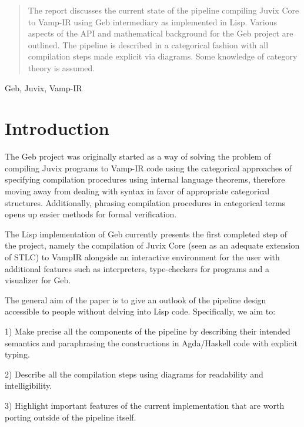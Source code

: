 



\begin{abstract}
The report discusses the current state of the pipeline compiling Juvix Core to Vamp-IR using Geb intermediary as implemented in Lisp. Various aspects of the API and mathematical background for the Geb project are outlined. The pipeline is described in a categorical fashion with all compilation steps made explicit via diagrams. Some knowledge of category theory is assumed.
\end{abstract}

\begin{keywords}
Geb, Juvix, Vamp-IR
\end{keywords}
\maketitle
\section{Introduction}

The Geb project was originally started as a way of solving the problem of compiling Juvix programs to Vamp-IR code using the categorical approaches of specifying compilation procedures using internal language theorems, therefore moving away from dealing with syntax in favor of appropriate categorical structures. Additionally, phrasing compilation procedures in categorical terms opens up easier methods for formal verification.

The Lisp implementation of Geb currently presents the first completed step of the project, namely the compilation of Juvix Core (seen as an adequate extension of STLC) to VampIR alongside an interactive environment for the user with additional features such as interpreters, type-checkers for programs and a visualizer for Geb.

The general aim of the paper is to give an outlook of the pipeline design accessible to people without delving into Lisp code. Specifically, we aim to:

1) Make precise all the components of the pipeline by describing their intended semantics and paraphrasing the constructions in Agda/Haskell code with explicit typing.

2) Describe all the compilation steps using diagrams for readability and intelligibility.

3) Highlight important features of the current implementation that are worth porting outside of the pipeline itself.

